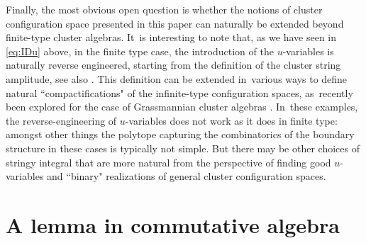 \documentclass[pdftex]{sigma}%
\numberwithin{equation}{section}
\begin{document}
\bigskip{}
Finally, the most obvious open question is whether the notions of cluster configuration space presented in this paper can naturally be extended beyond finite-type cluster algebras. It~is interesting to note that, as we have seen in \eqref{eq:IDu} above, in the finite type case, the introduction of the $u$-variables is naturally reverse engineered, starting from the definition of the cluster string amplitude, see also \cite{AHL}. This definition can be extended in~various ways to define natural ``compactifications" of the infinite-type configuration spaces, as~recently been explored for the case of Grassmannian cluster algebras \cite{ALS}. In~these examples, the reverse-engineering of $u$-variables does not work as it does in finite type: amongst other things the polytope capturing the combinatorics of the boundary structure in these cases is typically not simple. But there may be other choices of stringy integral that are more natural from the perspective of finding good $u$-variables and ``binary" realizations of general cluster configuration spaces.

\appendix

\section{A lemma in commutative algebra}
\end{document}

